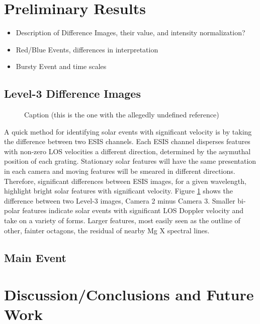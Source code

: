   

\section{Preliminary Results}
        \begin{itemize}
            \item Description of Difference Images, their value, and intensity normalization? 
                \item Red/Blue Events, differences in interpretation
                \item Bursty Event and time scales
        \end{itemize}
    \subsection{Level-3 Difference Images}

	\begin{figure}[htb!]
	    \centering
		\caption{Caption (this is the one with the allegedly undefined reference)}
		\label{fig:l3_dif}
	\end{figure}

        
        A quick method for identifying solar events with significant velocity is by taking the difference between two ESIS channels.
    	Each ESIS channel disperses features with non-zero LOS velocities a different direction, determined by the asymuthal position of each grating. 
    	Stationary solar features will have the same presentation in each camera and moving features will be smeared in different directions.
    	Therefore, significant differences between ESIS images, for a given wavelength, highlight bright solar features with significant velocity.
    	Figure \ref{fig:l3_dif} shows the difference between two Level-3 images, Camera 2 minus Camera 3. 
    	Smaller bi-polar features indicate solar events with significant LOS Doppler velocity and take on a variety of forms.
    	Larger features, most easily seen as the outline of other, fainter octagons, the residual of nearby Mg X spectral lines.
    
    \subsection{Main Event}

\section{Discussion/Conclusions and Future Work}

